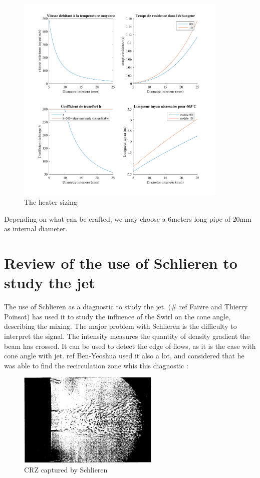 \begin{figure}[!h]
  \centering
\includegraphics[width=0.9\textwidth]{fig/dimensionnement_rechauffeur.pdf}
  \caption{The heater sizing}
 \label{heater_sizing}
\end{figure}

Depending on what can be crafted, we may choose a 6meters long pipe of 20mm as internal diameter.

\section{Review of the use of Schlieren to study the jet}

The use of Schlieren as a diagnostic to study the jet. (\# ref Faivre and Thierry Poinsot) has used it to study the influence of the Swirl on the cone angle, describing the mixing. The major problem with Schlieren is the difficulty to interpret the signal. The intensity measures the quantity of density gradient the beam has crossed. It can be used to detect the edge of flows, as it is the case with cone angle with jet.
ref  Ben-Yeoshua used it also a lot, and considered that he was able to find the recirculation zone whis this diagnostic :



\begin{figure}[!h]
  \centering
\includegraphics[width=0.6\textwidth]{fig/CRZ_schlieren_these}
  \caption{CRZ captured by Schlieren}
 \label{Schlieren CRZ}
\end{figure}

